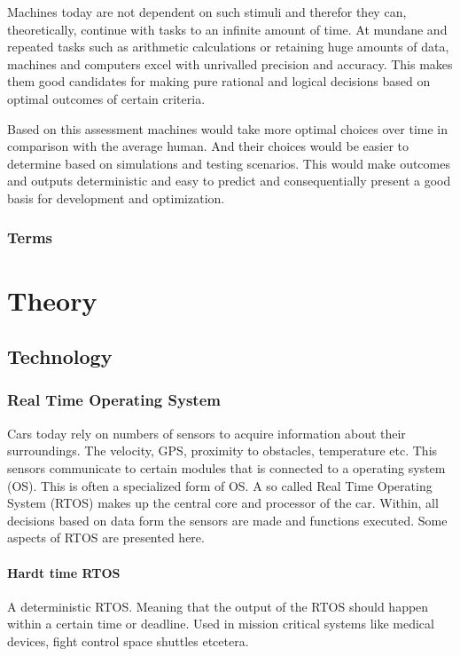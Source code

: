 \documentclass[conference]{IEEEtran}
\begin{document}
		 Machines today are not dependent on such stimuli and therefor they can, theoretically, continue with tasks to an
		 infinite amount of time. At mundane and repeated tasks such as arithmetic calculations or retaining huge amounts of data,
		 machines and computers excel with unrivalled precision and accuracy. This makes them good candidates for making
		 pure rational and logical decisions based on optimal outcomes of certain criteria.

		 Based on this assessment machines would take more optimal choices over time in comparison with the average human.
		 And their choices would be easier to determine based on simulations and testing scenarios.
		 This would make outcomes and outputs deterministic and easy to predict and consequentially present a good
		 basis for development and optimization.

	 \subsubsection{Terms}

\section{Theory}
 \subsection{Technology}
	 \subsubsection{Real Time Operating System}
		 Cars today rely on numbers of sensors to acquire information about their surroundings.
		 The velocity, GPS, proximity to obstacles, temperature etc. This sensors communicate to certain
		 modules that is connected to a operating system (OS). This is often a specialized form
		 of OS. A so called Real Time Operating System (RTOS) makes up the central core and processor
		 of the car. Within, all decisions based on data form the sensors are made and functions
		 executed. Some aspects of RTOS are presented here.
		 \paragraph{Hardt time RTOS}
		 A deterministic RTOS. Meaning that the output of the RTOS should happen within a certain
		 time or deadline. Used in mission critical systems like medical devices, fight control
		 space shuttles etcetera.
\end{document}
